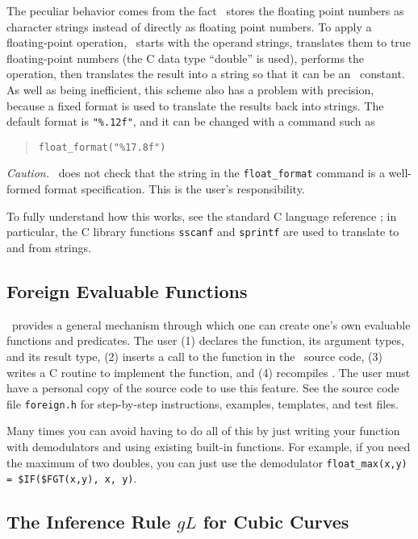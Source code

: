 \documentclass[11pt]{article}
\begin{document}
The peculiar behavior comes from the fact \otter\ stores the floating
point numbers as character strings instead of directly as floating
point numbers.  To apply a floating-point operation, \otter\ starts
with the operand strings, translates them to true floating-point
numbers (the C data type ``double'' is used), performs the operation,
then translates the result into a string so that it can be an \otter\
constant.  As well as being inefficient, this scheme also has a
problem with precision, because a fixed format is used to translate
the results back into strings.  The default format is \verb:"%.12f":,
and it can be changed with a command such as
\begin{verse} \small
\verb:float_format("%17.8f"):
\end{verse}
{\em Caution.}  \otter\ does not check that the string
in the \verb:float_format: command is a well-formed format
specification.  This is the user's responsibility.

To fully understand how this
works, see the standard C language reference \cite[Appendix B]{c-2ed};
in particular, the C library functions \verb:sscanf: and
\verb:sprintf: are used to translate to and from strings.

\subsection{Foreign Evaluable Functions} \label{foreign}

\otter\ provides a general mechanism through which one can create one's
own evaluable functions and predicates.  The user (1) declares the
function, its argument types, and its result type, (2) inserts a call to the
function in the \otter\ source code, (3) writes a C routine to implement
the function, and (4) recompiles \otter.
The user must have a personal copy of the source code to use this
feature.  See the source code file \verb:foreign.h: for step-by-step
instructions, examples, templates, and test files.

   Many times you can avoid having
to do all of this by just writing your function with demodulators and
using existing built-in functions.  For example, if you need the maximum
of two doubles, you can just use the demodulator
\verb:float_max(x,y) = $IF($FGT(x,y), x, y):.

\subsection{The Inference Rule $gL$ for Cubic Curves} \label{gl}
\end{document}
